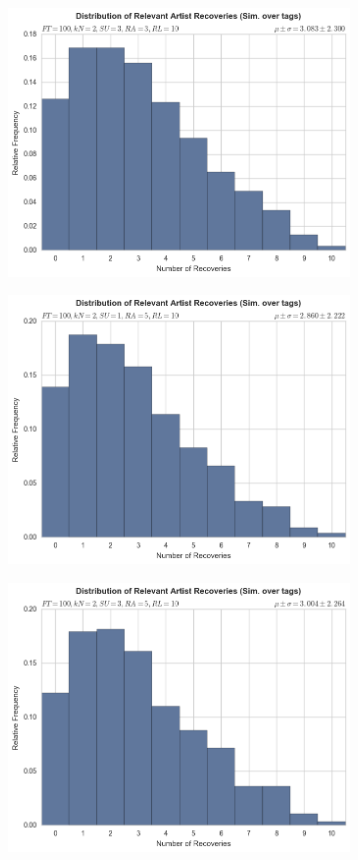 \documentclass[12pt]{article}
\begin{document}
\begin{figure}[h!]
\begin{subfigure}
  \end{subfigure}
  \begin{subfigure}
      \centering
    \includegraphics[height=2.8in]{tags,FT=100,kN=2,SU=3,RA=3,RL=10.png}
  \end{subfigure}
  \begin{subfigure}
      \centering
    \includegraphics[height=2.8in]{tags,FT=100,kN=2,SU=1,RA=5,RL=10.png}
  \end{subfigure}
  \begin{subfigure}
      \centering
    \includegraphics[height=2.8in]{tags,FT=100,kN=2,SU=3,RA=5,RL=10.png}
  \end{subfigure}
\end{figure}
\end{document}
